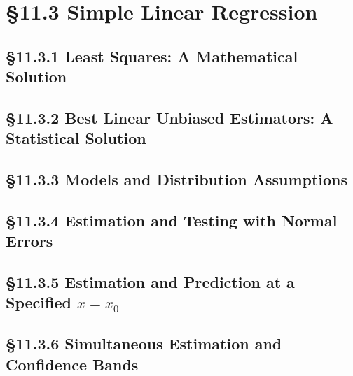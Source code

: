 \documentclass[11pt]{article}
\begin{document}
\section{\S11.3 Simple Linear Regression}

\subsection{\S11.3.1 Least Squares: A Mathematical Solution}

\subsection{\S11.3.2 Best Linear Unbiased Estimators: A Statistical Solution}

\subsection{\S11.3.3 Models and Distribution Assumptions}

\subsection{\S11.3.4 Estimation and Testing with Normal Errors}

\subsection{\S11.3.5 Estimation and Prediction at a Specified $x=x_0$}

\subsection{\S11.3.6 Simultaneous Estimation and Confidence Bands}
\end{document}
